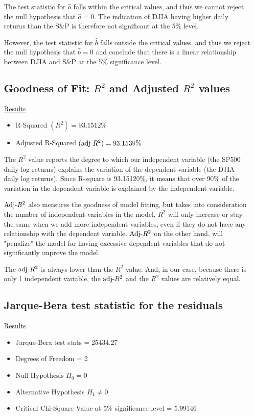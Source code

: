 \documentclass[a4paper]{article}
\begin{document}
	The test statistic for $\hat{a}$ falls within the critical values, and thus we cannot reject the null hypothesis that $\hat{a}=0$. The indication of DJIA having higher daily returns than the S\&P is therefore not significant at the 5\% level.  
	
	However, the test statistic for $\hat{b}$ falls outside the critical values, and thus we reject the null hypothesis that $\hat{b}=0$ and conclude that there is a linear relationship between DJIA and S\&P at the 5\% significance level. 
	
	
	\subsection{Goodness of Fit: $R^2$ and Adjusted $R^2$ values}
	\underline{Results}
	\begin{itemize}[nosep]
		\item R-Squared $(R^2) = 93.1512\%$
		\item Adjusted R-Squared $(\textnormal{adj-}R^2) = 93.1539\%$
	\end{itemize}

	The $R^2$ value reports the degree to which our independent variable (the SP500 daily log returns) explains the variation of the dependent variable (the DJIA daily log returns). Since R-square is 93.15120\%, it means that over 90\% of the variation in the dependent variable is explained by the independent variable.
	
	$\textnormal{Adj-}R^2$ also measures the goodness of model fitting, but takes into consideration the number of independent variables in the model. $R^2$ will only increase or  stay the same when we add more independent variables, even if they do not have any relationship with the dependent variable. $\textnormal{Adj-}R^2$ on the other hand, will "penalize" the model for having excessive dependent variables that do not significantly improve the model. 
	
	The $\textnormal{adj-}R^2$ is always lower than the $R^2$ value. And, in our case, because there is only 1 independent variable, the $\textnormal{adj-}R^2$ and the $R^2$ values are relatively equal.
	
	\subsection{Jarque-Bera test statistic for the residuals}
	\underline{Results}
	\begin{itemize}[nosep]
		\item Jarque-Bera test stats = 25434.27
		\item Degrees of Freedom = 2
		\item Null Hypothesis $H_0 = 0$
		\item Alternative Hypothesis $H_1 \ne 0$
		\item Critical Chi-Square Value at 5\% significance level = 5.99146
	\end{itemize}
	
\end{document}
